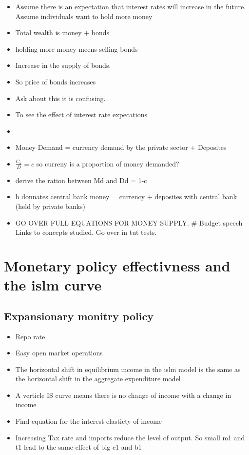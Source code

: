 \documentclass[twocolumn]{article}
\begin{document}
\begin{itemize}
\item
  Assume there is an expectation that interest rates will increase in
  the future. Assume individuals want to hold more money
\item
  Total wealth is money + bonds
\item
  holding more money meens selling bonds
\item
  Increase in the supply of bonds.
\item
  So price of bonds increases
\item
  Ask about this it is confusing.
\item
  To see the effect of interest rate expecations
\item
\item
  Money Demand = currency demand by the private sector + Deposites
\item
  \(\frac{C_u}{D} = c\) so curreny is a proportion of money demanded?
\item
  derive the ration between Md and Dd = 1-c
\item
  h donnates central bank money = currency + deposites with central bank
  (held by private banks)
\item
  GO OVER FULL EQUATIONS FOR MONEY SUPPLY. \# Budget speech Links to
  concepts studied. Go over in tut tests.
\end{itemize}

\hypertarget{monetary-policy-effectivness-and-the-islm-curve}{%
\section{Monetary policy effectivness and the islm
curve}\label{monetary-policy-effectivness-and-the-islm-curve}}

\hypertarget{expansionary-monitry-policy}{%
\subsection{Expansionary monitry
policy}\label{expansionary-monitry-policy}}

\begin{itemize}
\item
  Repo rate
\item
  Easy open market operations
\item
  The horizontal shift in equilibrium income in the islm model is the
  same as the horizontal shift in the aggregate expenditure model
\item
  A verticle IS curve means there is no change of income with a change
  in income
\item
  Find equation for the interest elasticty of income
\item
  Increasing Tax rate and imports reduce the level of output. So small
  m1 and t1 lead to the same effect of big c1 and b1
\end{itemize}
\end{document}
